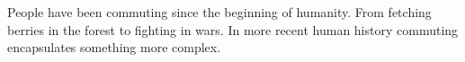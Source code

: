 People have been commuting since the beginning of humanity.
From fetching berries in the forest to fighting in wars.
In more recent human history commuting encapsulates something more complex.
